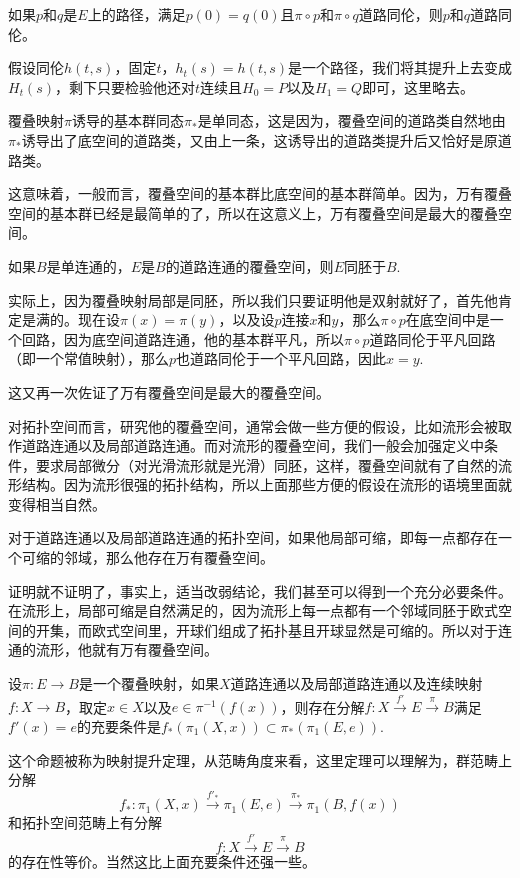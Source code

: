 \pro 如果$p$和$q$是$E$上的路径，满足$p(0)=q(0)$且$\pi\circ p$和$\pi\circ q$道路同伦，则$p$和$q$道路同伦。

假设同伦$h(t,s)$，固定$t$，$h_t(s)=h(t,s)$是一个路径，我们将其提升上去变成$H_t(s)$，剩下只要检验他还对$t$连续且$H_0=P$以及$H_1=Q$即可，这里略去。

\para 覆叠映射$\pi$诱导的基本群同态$\pi_*$是单同态，这是因为，覆叠空间的道路类自然地由$\pi_*$诱导出了底空间的道路类，又由上一条，这诱导出的道路类提升后又恰好是原道路类。

这意味着，一般而言，覆叠空间的基本群比底空间的基本群简单。因为，万有覆叠空间的基本群已经是最简单的了，所以在这意义上，万有覆叠空间是最大的覆叠空间。

\para 如果$B$是单连通的，$E$是$B$的道路连通的覆叠空间，则$E$同胚于$B$.

实际上，因为覆叠映射局部是同胚，所以我们只要证明他是双射就好了，首先他肯定是满的。现在设$\pi(x)=\pi(y)$，以及设$p$连接$x$和$y$，那么$\pi\circ p$在底空间中是一个回路，因为底空间道路连通，他的基本群平凡，所以$\pi\circ p$道路同伦于平凡回路（即一个常值映射），那么$p$也道路同伦于一个平凡回路，因此$x=y$.

这又再一次佐证了万有覆叠空间是最大的覆叠空间。

\para 对拓扑空间而言，研究他的覆叠空间，通常会做一些方便的假设，比如流形会被取作道路连通以及局部道路连通。而对流形的覆叠空间，我们一般会加强定义中条件，要求局部微分（对光滑流形就是光滑）同胚，这样，覆叠空间就有了自然的流形结构。因为流形很强的拓扑结构，所以上面那些方便的假设在流形的语境里面就变得相当自然。

\theo 对于道路连通以及局部道路连通的拓扑空间，如果他局部可缩，即每一点都存在一个可缩的邻域，那么他存在万有覆叠空间。

证明就不证明了，事实上，适当改弱结论，我们甚至可以得到一个充分必要条件。在流形上，局部可缩是自然满足的，因为流形上每一点都有一个邻域同胚于欧式空间的开集，而欧式空间里，开球们组成了拓扑基且开球显然是可缩的。所以对于连通的流形，他就有万有覆叠空间。

\para 设$\pi:E\to B$是一个覆叠映射，如果$X$道路连通以及局部道路连通以及连续映射$f:X\to B$，取定$x\in X$以及$e\in \pi^{-1}(f(x))$，则存在分解$f:X\xrightarrow{f'} E\xrightarrow{\pi} B$满足$f'(x)=e$的充要条件是$f_*(\pi_1(X,x))\subset \pi_*(\pi_1(E,e))$.

这个命题被称为映射提升定理，从范畴角度来看，这里定理可以理解为，群范畴上分解
\[f_*:\pi_1(X,x)\xrightarrow{f'_*} \pi_1(E,e)\xrightarrow{\pi_*} \pi_1(B,f(x))\]
和拓扑空间范畴上有分解
\[f:X\xrightarrow{f'} E\xrightarrow{\pi} B\]
的存在性等价。当然这比上面充要条件还强一些。

